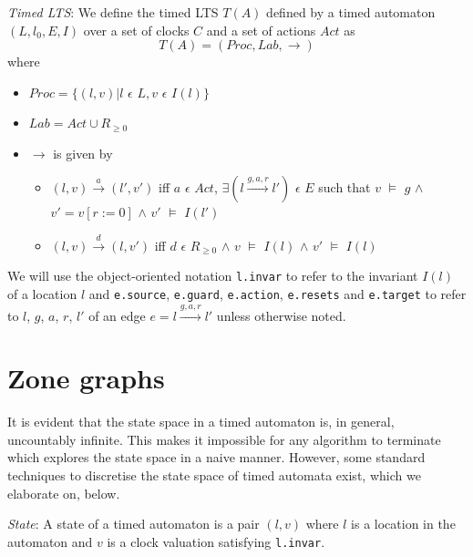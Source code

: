\documentclass[a4paper]{llncs}
\begin{document}
\begin{definition}
  \emph{Timed LTS}: We define the timed LTS $T(A)$ defined by a timed
  automaton $(L, l_{0}, E, I)$ over a set of clocks $C$ and a set of
  actions $Act$ as 
  \begin{displaymath}
    T(A) = (Proc, Lab, \rightarrow)
  \end{displaymath}
  where
  \begin{itemize}
  \item $Proc = \{(l, v) | l$ $\epsilon$ $L, v$ $\epsilon$ $I(l)\}$
  \item $Lab = Act \cup R_{\ge 0}$
  \item $\rightarrow$ is given by
    \begin{itemize}
    \item $(l, v) \xrightarrow{a} (l', v')$ iff $a$ $\epsilon$ $Act$, $\exists (l
      \xrightarrow{g, a, r} l')$ $\epsilon$ $E$ such that $v$ $\models$
      $g$ $\wedge$ $v'=v[r:=0]$ $\wedge$ $v'$ $\models$ $I(l')$
    \item $(l, v) \xrightarrow{d} (l, v')$ iff $d$ $\epsilon$ $R_{\ge
      0}$ $\wedge$ $v$ $\models$ $I(l)$ $\wedge$ $v'$ $\models$ $I(l)$
    \end{itemize}
  \end{itemize}

\end{definition}

We will use the object-oriented notation \texttt{l.invar} to refer to
the invariant $I(l)$ of a location $l$ and \texttt{e.source}, \texttt{e.guard},
\texttt{e.action}, \texttt{e.resets} and \texttt{e.target} to refer to
$l$, $g$, $a$, $r$, $l'$ of
an edge $e = l \xrightarrow{g, a, r} l'$ unless otherwise noted.

\section{Zone graphs}

It is evident that the state space in a timed automaton is, in
general, uncountably infinite. This makes it impossible for any
algorithm to terminate which explores the state space in a naive
manner. However, some standard techniques to discretise the state
space of timed automata exist, which we elaborate on, below.

\begin{definition}
  \emph{State}: A state of a timed automaton is a pair $(l, v)$
  where $l$ is a location in the automaton and $v$ is a clock
  valuation satisfying \texttt{l.invar}.
\end{definition}
\end{document}
